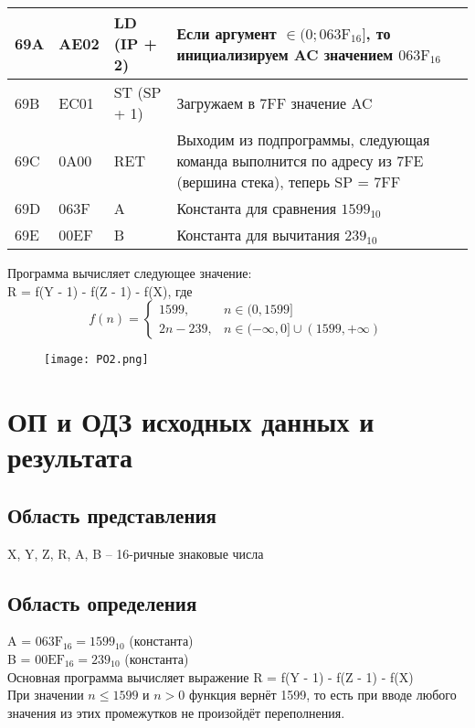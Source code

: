 \begin{longtable}{|>{\centering\arraybackslash}p{1cm}|>{\centering\arraybackslash}p{3cm}|>{\centering\arraybackslash}p{3cm}|>{\arraybackslash}p{8cm}|}
69A & AE02 & LD (IP + 2) & Если аргумент $\in (0; \text{063F}_{16}]$, то инициализируем AC значением $\text{063F}_{16}$ \\\hline
69B & EC01 & ST (SP + 1) & Загружаем в 7FF значение AC \\\hline
69C & 0A00 & RET & Выходим из подпрограммы, следующая команда выполнится по адресу из 7FE (вершина стека), теперь SP = 7FF \\\hline
69D & 063F & A & Константа для сравнения $1599_{10}$ \\\hline
69E & 00EF & B & Константа для вычитания $239_{10}$ \\\hline
\end{longtable}
\noindent Программа вычисляет следующее значение: \\
R = f(Y - 1) - f(Z - 1) - f(X), где \\
\[
f(n) =
\begin{cases}
    1599, & n \in (0, 1599] \\
    2n - 239, & n \in (-\infty, 0] \cup (1599, +\infty)
\end{cases}
\]
\begin{figure}[H]
    \centering
\texttt{[image: PO2.png]}
\end{figure}
\section{ОП и ОДЗ исходных данных и результата}
\subsection{Область представления}
X, Y, Z, R, A, B – 16-ричные знаковые числа
\subsection{Область определения}
A = $063\text{F}_{16} = 1599_{10}$ (константа) \\
B = $00\text{EF}_{16} = 239_{10}$ (константа) \\
Основная программа вычисляет выражение R = f(Y - 1) - f(Z - 1) - f(X) \\

\noindent При значении $n \leq 1599$ и $n > 0$ функция вернёт 1599, то есть при вводе любого значения из этих промежутков не произойдёт переполнения. \\

